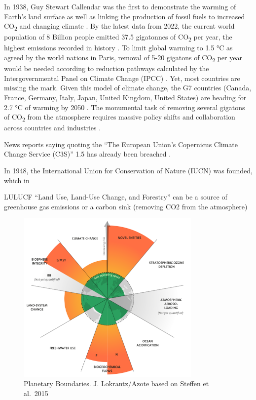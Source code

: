 \documentclass[
  letterpaper,
  DIV=11,
  numbers=noendperiod]{scrartcl}
\begin{document}
In 1938, Guy Stewart Callendar was the first to demonstrate the warming
of Earth's land surface as well as linking the production of fossil
fuels to increased CO\textsubscript{2} and changing climate
\citep{hawkinsIncreasingGlobalTemperatures2013}. By the latest data from
2022, the current world population of 8 Billion people emitted 37.5
gigatonnes of CO\textsubscript{2} per year, the highest emissions
recorded in history \citep{statistaAnnualCO2Emissions2023}. To limit
global warming to 1.5 °C as agreed by the world nations in Paris,
removal of 5-20 gigatons of CO\textsubscript{2} per year would be needed
according to reduction pathways calculated by the Intergovernmental
Panel on Climate Change (IPCC) \citep{wadeMoisturedrivenCO2Pump2023}.
Yet, most countries are missing the mark. Given this model of climate
change, the G7 countries (Canada, France, Germany, Italy, Japan, United
Kingdom, United States) are heading for 2.7 °C of warming by 2050
\citep{cdpMissingMarkCDP2022}. The monumental task of removing several
gigatons of CO\textsubscript{2} from the atmosphere requires massive
policy shifts and collaboration across countries and industries
\citep{macklerPolicyAgendaGigatonscale2021}.

News reports saying quoting the ``The European Union's Copernicus
Climate Change Service (C3S)'' 1.5 has already been breached
\citep{WorldFirstYearlong2024, FirstTimeWorld2024}.

In 1948, the International Union for Conservation of Nature (IUCN) was
founded, which in

LULUCF ``Land Use, Land-Use Change, and Forestry'' can be a source of
greenhouse gas emissions or a carbon sink (removing CO2 from the
atmosphere)

\begin{figure}[H]

{\centering \includegraphics[width=0.8\textwidth,height=\textheight]{./images/boundaries.png}

}

\caption{Planetary Boundaries. J. Lokrantz/Azote based on Steffen et
al.~2015}

\end{figure}%
\end{document}
